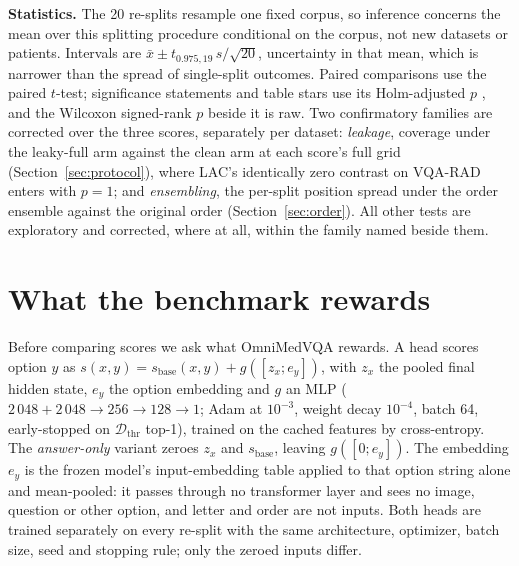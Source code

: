\documentclass[a4paper,conference]{IEEEtran}
\newcommand{\Dthr}{\mathcal{D}_{\mathrm{thr}}}
\newcommand{\sbase}{s_{\mathrm{base}}}
\newcommand{\rtag}[1]{}
\begin{document}
\textbf{Statistics.} The 20 re-splits resample one fixed corpus, so inference
concerns the mean over this splitting procedure conditional on the corpus, not
new datasets or patients. Intervals are
$\bar x\pm t_{0.975,19}\,s/\sqrt{20}$, uncertainty in that mean, which is
narrower than the spread of single-split outcomes.\rtag{R2.4} Paired comparisons use the
paired $t$-test; significance statements and table stars use its
Holm-adjusted $p$ \cite{holm1979simple}, and the Wilcoxon signed-rank $p$
\cite{wilcoxon1945individual} beside it is raw. Two confirmatory families are
corrected over the three scores, separately per dataset: \emph{leakage},
coverage under the leaky-full arm against the clean arm at each score's full
grid (Section~\ref{sec:protocol}), where LAC's identically zero contrast on
VQA-RAD enters with $p=1$; and \emph{ensembling}, the per-split position spread
under the order ensemble against the original order (Section~\ref{sec:order}).
All other tests are exploratory and corrected, where at all, within the family
named beside them.

\section{What the benchmark rewards}\label{sec:shortcut}

Before comparing scores we ask what OmniMedVQA rewards. A head scores option
$y$ as $s(x,y)=\sbase(x,y)+g([z_x;e_y])$, with $z_x$ the pooled final hidden
state, $e_y$ the option embedding and $g$ an MLP
($2\,048{+}2\,048\to256\to128\to1$; Adam at $10^{-3}$, weight decay $10^{-4}$,
batch 64, early-stopped on $\Dthr$ top-1), trained on the cached features by
cross-entropy. The \emph{answer-only} variant zeroes $z_x$ and $\sbase$,
leaving $g([0;e_y])$. The embedding $e_y$ is the frozen model's input-embedding
table applied to that option string alone and mean-pooled: it passes through no
transformer layer and sees no image, question or other option, and letter and
order are not inputs. Both heads are trained separately on every re-split with
the same architecture, optimizer, batch size, seed and stopping rule; only the
zeroed inputs differ.\rtag{R2.3}
\end{document}
